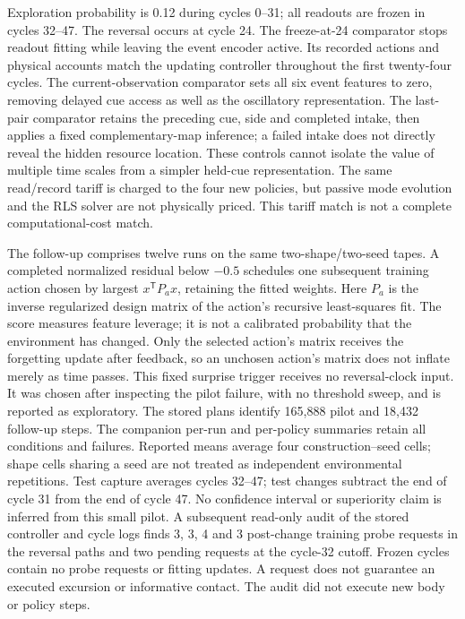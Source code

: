 Exploration probability is 0.12 during cycles 0--31; all readouts are frozen in cycles 32--47. The reversal occurs at cycle 24. The freeze-at-24 comparator stops readout fitting while leaving the event encoder active. Its recorded actions and physical accounts match the updating controller throughout the first twenty-four cycles. The current-observation comparator sets all six event features to zero, removing delayed cue access as well as the oscillatory representation. The last-pair comparator retains the preceding cue, side and completed intake, then applies a fixed complementary-map inference; a failed intake does not directly reveal the hidden resource location. These controls cannot isolate the value of multiple time scales from a simpler held-cue representation. The same read/record tariff is charged to the four new policies, but passive mode evolution and the RLS solver are not physically priced. This tariff match is not a complete computational-cost match.

The follow-up comprises twelve runs on the same two-shape/two-seed tapes. A completed normalized residual below $-0.5$ schedules one subsequent training action chosen by largest $x^{\mathsf T}P_a x$, retaining the fitted weights. Here $P_a$ is the inverse regularized design matrix of the action's recursive least-squares fit. The score measures feature leverage; it is not a calibrated probability that the environment has changed. Only the selected action's matrix receives the forgetting update after feedback, so an unchosen action's matrix does not inflate merely as time passes. This fixed surprise trigger receives no reversal-clock input. It was chosen after inspecting the pilot failure, with no threshold sweep, and is reported as exploratory. The stored plans identify 165,888 pilot and 18,432 follow-up steps. The companion per-run and per-policy summaries retain all conditions and failures. Reported means average four construction--seed cells; shape cells sharing a seed are not treated as independent environmental repetitions. Test capture averages cycles 32--47; test changes subtract the end of cycle 31 from the end of cycle 47. No confidence interval or superiority claim is inferred from this small pilot. A subsequent read-only audit of the stored controller and cycle logs finds 3, 3, 4 and 3 post-change training probe requests in the reversal paths and two pending requests at the cycle-32 cutoff. Frozen cycles contain no probe requests or fitting updates. A request does not guarantee an executed excursion or informative contact. The audit did not execute new body or policy steps.

